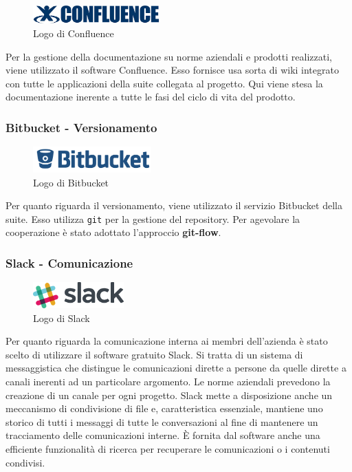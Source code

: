\begin{figure}[H]
\begin{center}
\includegraphics[height=0.7cm]{Pics/confluence_logo.jpeg}
\caption{Logo di Confluence}
\end{center}
\end{figure}

Per la gestione della documentazione su norme aziendali e prodotti realizzati, viene utilizzato il software Confluence. Esso fornisce usa sorta di wiki integrato con tutte le applicazioni della suite collegata al progetto. Qui viene stesa la documentazione inerente a tutte le fasi del ciclo di vita del prodotto.

\subsubsection{Bitbucket - Versionamento}
\begin{figure}[H]
\begin{center}
\includegraphics[height=1cm]{Pics/bitbucket_logo.png}
\caption{Logo di Bitbucket}
\end{center}
\end{figure}

Per quanto riguarda il versionamento, viene utilizzato il servizio Bitbucket della suite. Esso utilizza \texttt{git} per la gestione del repository. 
 Per agevolare la cooperazione è stato adottato l'approccio \textbf{git-flow}. 

\subsubsection{Slack - Comunicazione}

\begin{figure}[htbp]
\begin{center}
\includegraphics[height=1cm]{Pics/slack_logo.png}
\caption{Logo di Slack}
\end{center}
\end{figure}

Per quanto riguarda la comunicazione interna ai membri dell'azienda è stato scelto di utilizzare il software gratuito Slack. 
Si tratta di un sistema di messaggistica che distingue le comunicazioni dirette a persone da quelle dirette a canali inerenti ad un particolare argomento. Le norme aziendali prevedono la creazione di un canale per ogni progetto.
Slack mette a disposizione anche un meccanismo di condivisione di file e, caratteristica essenziale, mantiene uno storico di tutti i messaggi di tutte le conversazioni al fine di mantenere un tracciamento delle comunicazioni interne. 
È fornita dal software anche una efficiente funzionalità di ricerca per recuperare le comunicazioni o i contenuti condivisi.

